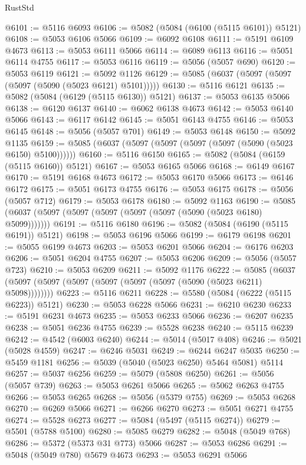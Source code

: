 \begin{lexlean}{RustStd}
\begin{coremodule}
@6101 := @5116 @6093
@6106 := @5082 (@5084 (@6100 (@5115 @6101)) @5121)
@6108 := @5053 @6106 @5066
@6109 := @6092 @6108
@6111 := @5191 @6109 @4673
@6113 := @5053 @6111 @5066
@6114 := @6089 @6113
@6116 := @5051 @6114 @4755
@6117 := @5053 @6116
@6119 := @5056 (@5057 @690)
@6120 := @5053 @6119
@6121 := @5092 @1126
@6129 := @5085 (@6037 (@5097 (@5097 (@5097 (@5090 (@5023 @6121) @5101)))))
@6130 := @5116 @6121
@6135 := @5082 (@5084 (@6129 (@5115 @6130)) @5121)
@6137 := @5053 @6135 @5066
@6138 := @6120 @6137
@6140 := @6062 @6138 @4673
@6142 := @5053 @6140 @5066
@6143 := @6117 @6142
@6145 := @5051 @6143 @4755
@6146 := @5053 @6145
@6148 := @5056 (@5057 @701)
@6149 := @5053 @6148
@6150 := @5092 @1135
@6159 := @5085 (@6037 (@5097 (@5097 (@5097 (@5097 (@5090 (@5023 @6150) @5100))))))
@6160 := @5116 @6150
@6165 := @5082 (@5084 (@6159 (@5115 @6160)) @5121)
@6167 := @5053 @6165 @5066
@6168 := @6149 @6167
@6170 := @5191 @6168 @4673
@6172 := @5053 @6170 @5066
@6173 := @6146 @6172
@6175 := @5051 @6173 @4755
@6176 := @5053 @6175
@6178 := @5056 (@5057 @712)
@6179 := @5053 @6178
@6180 := @5092 @1163
@6190 := @5085 (@6037 (@5097 (@5097 (@5097 (@5097 (@5097 (@5090 (@5023 @6180) @5099)))))))
@6191 := @5116 @6180
@6196 := @5082 (@5084 (@6190 (@5115 @6191)) @5121)
@6198 := @5053 @6196 @5066
@6199 := @6179 @6198
@6201 := @5055 @6199 @4673
@6203 := @5053 @6201 @5066
@6204 := @6176 @6203
@6206 := @5051 @6204 @4755
@6207 := @5053 @6206
@6209 := @5056 (@5057 @723)
@6210 := @5053 @6209
@6211 := @5092 @1176
@6222 := @5085 (@6037 (@5097 (@5097 (@5097 (@5097 (@5097 (@5097 (@5090 (@5023 @6211) @5098))))))))
@6223 := @5116 @6211
@6228 := @5580 (@5084 (@6222 (@5115 @6223)) @5121)
@6230 := @5053 @6228 @5066
@6231 := @6210 @6230
@6233 := @5191 @6231 @4673
@6235 := @5053 @6233 @5066
@6236 := @6207 @6235
@6238 := @5051 @6236 @4755
@6239 := @5528 @6238
@6240 := @5115 @6239
@6242 := @4542 (@6003 @6240)
@6244 := @5014 (@5017 @408)
@6246 := @5021 (@5028 @4559)
@6247 := @6246 @5031
@6249 := @6244 @6247 @5035
@6250 := @5459 @1181
@6256 := @5039 (@5040 (@5023 @6250) @5464 @5081) @5114
@6257 := @5037 @6256
@6259 := @5079 (@5808 @6250)
@6261 := @5056 (@5057 @739)
@6263 := @5053 @6261 @5066
@6265 := @5062 @6263 @4755
@6266 := @5053 @6265
@6268 := @5056 (@5379 @755)
@6269 := @5053 @6268
@6270 := @6269 @5066
@6271 := @6266 @6270
@6273 := @5051 @6271 @4755
@6274 := @5528 @6273
@6277 := @5084 (@5497 (@5115 @6274))
@6279 := @5501 (@5788 @5100)
@6280 := @5085 @6279
@6282 := @5048 (@5049 @768)
@6286 := @5372 (@5373 @31 @773) @5066
@6287 := @5053 @6286
@6291 := @5048 (@5049 @780) @5679 @4673
@6293 := @5053 @6291 @5066

\end{coremodule}
\end{lexlean}
